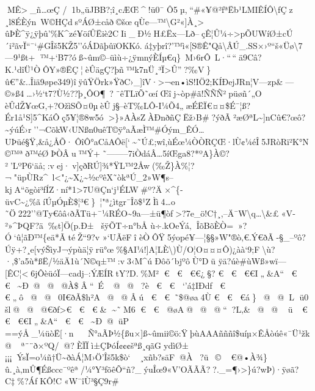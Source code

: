 MÊ\textgreater\_\textbar ñ\ldots œÇ /1b„üJBB?;î¸cÆŒ\^{}!ü0¯
Ô5µ,``\#«¥@²ƒªËb¹LMIÊÍÔ\textbackslash fÇz
¸l8ÉÈýn~W©HÇdsºÁØ±cåð©šœqÙe---™\textbackslash G²«{]}À¸\textgreater{}
ûÞÈ\^{}ÿ¿ÿþû'\%K\^{}zé¥öíÛËiè2CIi\_Ð½H£Ëx---Lð--çÊ¦Û¼\textbar\textbackslash@÷\textgreater pÕUWíØ±cÚ´i²ãvÏ``¯`\#GÎš5KŽ5''óÁDãþûïOKKó.á‡yþrî?'™ì«{[}S®Ê"Qå\textbackslash ÂÚ\_.SS×›º``š«Üø\textbackslash7---\textquotesingle9¹ßt+
™+`B7?óß\textasciitilde ûm©--üìù÷¿ÿmnýÈÍµ€q\}~M›6rÔ~L·``\,``ä9Câ?K.¹dîÜ¹ÒÔY»®ËÇ¦èÛägÇ?þñ™k7nÜ¸³Ï\textgreater Û''?‰V\}û€''\&..Îiä9\textbar øpe349)îÿûŸÖrk»ŸðC›\_{]}îV·\textgreater¬en•ìS!IÖ2;KÍÐejJRn¦V---zp­\&---\textquotesingle©»ß4\ldots›½\textquotesingle`t7?Ù½??þ¸ÔO¶~?¨êTLïÕ˜œíŒîj\textasciitilde òp\#ã!ÑÑÑ²püøñ´„O
èÛdŽ¥œG,+?\textquotesingle OžìSÕ¤0µèÛj§--èT‰LÔ-I¼Õ4„æÉËÏ€¤¤\$É¯¦ß?Ér1å¹S{]}5\^{}KáÔç5¥¦®8w\textquotesingle5ó\textgreater\textquotesingle\}»AÀsZÀÐnðñÇËž›B\#?ýðÃ²æØªL\textasciitilde{]}nCû€?œô?\textasciitilde ýúÉ›r''¬CõkW‹UNßn0uêT©ÿ°aÃæÌ™\#Óým\_ÊÓ\ldots\textbar UÞüé§Ÿ,\&å¿ÅÕ·ÔîÔ°aCåAÔë{[}`\textasciitilde˜Ú£;wî,ùÉœ¼ÒÒRÇŒ·lÙ¢¼éÎ5JRòRï²K°N©™ªð™éØÞÒÂ u™Ý+˜--------7iÒdáÂ\ldots5íŒga8?*ºA\}À©?²'LºP6`äå;:vej·v{]}çðRÚ{]}¾*ŸL™2Åw(‰Ž\}À\%¦?¬"üpÙRz\^{}~l\textless"¿\textasciitilde X¿\textasciitilde½cºêX˜òkªÚ\_2»W¶s--kjA``õgòi³fÍZ·ní*1\textgreater7U@Çn`j¹ÉLW\#º?Ä×\^{}\{­üvC\textasciitilde¿\%ãíÚµÓµÈ\$¦³€\}~¦"ª¿ìtgr¯Îõ\$¹ZÌì4\ldots o
˜Ö222''@Ty€ôâ‹ðÃTü+¯¼RÉO\textasciitilde9a---±ü¶òƒ\textgreater?7e\_ö!C†¸,--Ä¯W\textbackslash q\ldots\textbackslash\&£«V­²»\^{}ÞQF?ä‰t{]}Ö(p.Ð±šÿÕT÷n°bÅ
ù÷.kOeÝá‚ÎõBõÈÒ=»?Ó`û¦ãÐ™\{eä*ÃtéŽ``9?v »`UÃëFî
èÒÔŸ5ýopé¥---¦§§»W"®ò‚€.Ý€ðÃ-§\_--ºô?Úÿ+?¸e{[}výŠìyJ¬ýpùä¦ÿrü°œ\%§AI¼!{]}A¦LÈ\textbackslash)Ù/O¦O¤¤¤Ô)¿àà`9;F\textbackslash ù?·,\$'a5ù*ßË/½äÄ1ù´N©q±™:v3‹M\^{}ú
Ðôõ´bjºôÙ°Dü
ÿä?úè\#ùWß»wï---{[}ÊC¦\textless6jÔèüóÏ---cadj--:ÝÆÍRtY?D.\%M² €  €  €€­ ¿§?
€  €  €€I„\&A`` €  € \textasciitilde Ð@ @ @À\$Â``~É@ @ ?è €  €  `' á‡IÐdƒ  € 
€ „ô@ @ 0I€ðÃ\$h²A @ @ Âú  €  € ˜\$@øa4Ù €  €  € á\} @ @ L ü0 šl@ @ @€ðƒ\textgreater€  € 
€ \& \textasciitilde˜M6 €  €  @øA@ @ @ ``?L‚\&@ @  ü~ €  €  €€I„\&A`` € 
€ \textasciitilde Ð@ üP
==ýÅ\_¼üòË{[}·nÑ°aÃÞ½\{ßu×{]}ß\textasciitilde ûmii©ö:ŸþùAAAñññî\$uíµ×ÊÅòúê«¯Ü¹žk@ ª¨¨ð×ºQ/@ ? ÈÏÏì±ÇÞ\textbar óÍ¢¢¢šªß¸qãGydìØ±¡¡¡ÝsÏ=o¼ñ†Ü\textasciitilde ðàÁ¦M›Ö'Îš5k\$ò`¸xñb?säF@À?ü~©
€@•À¾\}û.¸à‚mÛ¶Éßccc¯ºêª/¼°Y³fõêÕ``ñ?\_ýuÎœ9«V­'OÃÃÃ??.\_=¶›\textgreater\}ú?wÞ)·ÿøã?C‡­\%?ÁƒKÔ!C«W¯îÙ³§Ç9r\#
